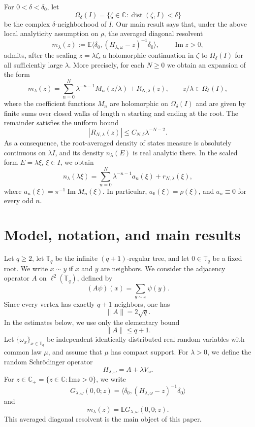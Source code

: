 \documentclass[a4paper,11pt]{article}
\newcommand{\E}{\mathbb{E}}
\newcommand{\Impart}{\mathrm{Im}}
\begin{document}
For $0<\delta<\delta_0$, let
$$
\Omega_\delta(I)
=
\{\zeta\in\mathbb C:\operatorname{dist}(\zeta,I)<\delta\}
$$
be the complex $\delta$-neighborhood of $I$. 
Our main result says that, under the above local analyticity assumption on $\rho$, 
the averaged diagonal resolvent
$$
m_\lambda(z) := \mathbb E\langle \delta_0,(H_{\lambda,\omega}-z)^{-1}\delta_0\rangle,
\qquad \operatorname{Im}z>0,
$$
admits, after the scaling $z=\lambda\zeta$, a holomorphic continuation
in $\zeta$ to $\Omega_\delta(I)$ for all sufficiently large $\lambda$.
More precisely, for each $N\ge 0$ we obtain an expansion of the form
$$
m_\lambda(z) = \sum_{n=0}^{N}\lambda^{-n-1}M_n(z/\lambda) + R_{N,\lambda}(z),
\qquad z/\lambda\in\Omega_\delta(I),
$$
where the coefficient functions $M_n$ are holomorphic on
$\Omega_\delta(I)$ and are given by finite sums over closed walks of
length $n$ starting and ending at the root. 
The remainder satisfies the uniform bound
$$
|R_{N,\lambda}(z)|\le C_{N,\delta}\lambda^{-N-2}.
$$
As a consequence, the root-averaged density of states measure is
absolutely continuous on $\lambda I$, 
and its density $n_\lambda(E)$ is real analytic there. 
In the scaled form $E=\lambda\xi$, $\xi\in I$, we obtain
$$
n_\lambda(\lambda\xi) = \sum_{n=0}^{N}\lambda^{-n-1}a_n(\xi) + r_{N,\lambda}(\xi),
$$
where $a_n(\xi)=\pi^{-1}\operatorname{Im}M_n(\xi)$. 
In particular, $a_0(\xi)=\rho(\xi)$, and $a_n\equiv0$ for every odd $n$.

\section{Model, notation, and main results}

Let $q\ge2$, let $\mathbb T_q$ be the infinite $(q+1)$-regular tree,
and let $0\in\mathbb T_q$ be a fixed root.
We write $x\sim y$ if $x$ and $y$ are neighbors.
We consider the adjacency operator $A$ on $\ell^2(\mathbb T_q)$,
defined by
$$
(A\psi)(x)=\sum_{y\sim x}\psi(y).
$$
Since every vertex has exactly $q+1$ neighbors, one has
$$
\|A\|=2\sqrt{q}.
$$
In the estimates below, we use only the elementary bound
$$
\|A\|\le q+1.
$$
Let $\{\omega_x\}_{x\in\mathbb T_q}$ be independent identically
distributed real random variables with common law $\mu$, and assume that
$\mu$ has compact support. 
For $\lambda>0$, we define the random Schr\"odinger operator
$$
H_{\lambda,\omega}=A+\lambda V_\omega.
$$
For $z\in\mathbb C_+=\{z\in\mathbb C:\Impart z>0\}$, we write
$$
G_{\lambda,\omega}(0,0;z)
=
\langle \delta_0,(H_{\lambda,\omega}-z)^{-1}\delta_0\rangle
$$
and
$$
m_\lambda(z)=\E G_{\lambda,\omega}(0,0;z).
$$
This averaged diagonal resolvent is the main object of this paper.
\end{document}
